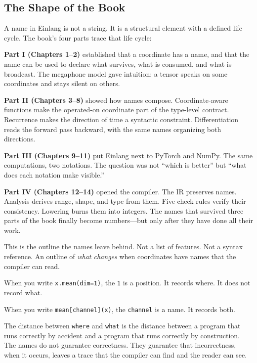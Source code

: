 \documentclass[11pt,titlepage]{article}
\begin{document}
\vspace{2em}

\hypertarget{the-shape-of-the-book}{%
\subsection{The Shape of the Book}\label{the-shape-of-the-book}}

A name in Einlang is not a string. It is a structural element with a
defined life cycle. The book's four parts trace that life cycle:

\textbf{Part I (Chapters 1--2)} established that a coordinate has a
name, and that the name can be used to declare what survives, what is
consumed, and what is broadcast. The megaphone model gave intuition: a
tensor speaks on some coordinates and stays silent on others.

\textbf{Part II (Chapters 3--8)} showed how names compose.
Coordinate-aware functions make the operated-on coordinate part of the
type-level contract. Recurrence makes the direction of time a syntactic
constraint. Differentiation reads the forward pass backward, with the
same names organizing both directions.

\textbf{Part III (Chapters 9--11)} put Einlang next to PyTorch and
NumPy. The same computations, two notations. The question was not
``which is better'' but ``what does each notation make visible.''

\textbf{Part IV (Chapters 12--14)} opened the compiler. The IR preserves
names. Analysis derives range, shape, and type from them. Five check
rules verify their consistency. Lowering burns them into integers. The
names that survived three parts of the book finally become numbers---but
only after they have done all their work.

\vspace{2em}

This is the outline the names leave behind. Not a list of features. Not
a syntax reference. An outline of \emph{what changes} when coordinates
have names that the compiler can read.

When you write \texttt{x.mean(dim=1)}, the \texttt{1} is a position. It
records where. It does not record what.

When you write \texttt{mean{[}channel{]}(x)}, the \texttt{channel} is a
name. It records both.

The distance between \texttt{where} and \texttt{what} is the distance
between a program that runs correctly by accident and a program that
runs correctly by construction. The names do not guarantee correctness.
They guarantee that incorrectness, when it occurs, leaves a trace that
the compiler can find and the reader can see.
\end{document}
